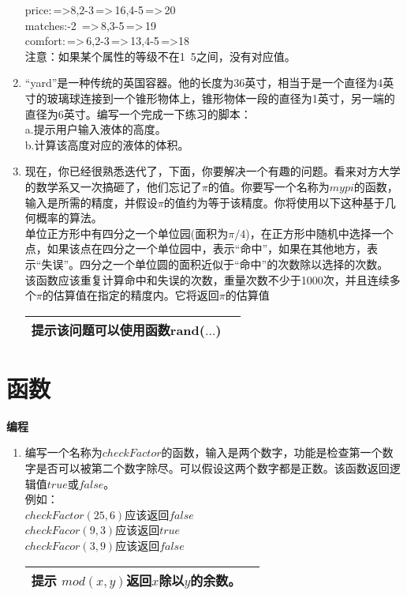 \documentclass[UTF8]{ctexart}
\begin{document}
\begin{enumerate}
	price:\,=>8,2-3\,=>\,16,4-5\,=>\,20\\
	matches:-2 \,=>\,8,3-5\,=>\,19\\
	comfort:\,=>\,6,2-3\,=>\,13,4-5\,=>18\\
	注意：如果某个属性的等级不在1~5之间，没有对应值。
	\item “yard”是一种传统的英国容器。他的长度为36英寸，相当于是一个直径为4英寸的玻璃球连接到一个锥形物体上，锥形物体一段的直径为1英寸，另一端的直径为6英寸。编写一个完成一下练习的脚本：\\
	a.提示用户输入液体的高度。\\
	b.计算该高度对应的液体的体积。
	\item 现在，你已经很熟悉迭代了，下面，你要解决一个有趣的问题。看来对方大学的数学系又一次搞砸了，他们忘记了$\pi$的值。你要写一个名称为$mypi$的函数，输入是所需的精度，并假设$\pi$的值约为等于该精度。你将使用以下这种基于几何概率的算法。\\
	单位正方形中有四分之一个单位园(面积为$\pi/4$)，在正方形中随机中选择一个点，如果该点在四分之一个单位园中，表示“命中”，如果在其他地方，表示“失误”。四分之一个单位圆的面积近似于“命中”的次数除以选择的次数。\\该函数应该重复计算命中和失误的次数，重量次数不少于1000次，并且连续多个$\pi$的估算值在指定的精度内。它将返回$\pi$的估算值\\
	\begin{table}[H]
		\centering
		\begin{tabular}{|p{10cm}|l|}
		\hline
		\textbf{提示}\qquad 该问题可以使用函数rand($\dots$)\\
		\hline
		\end{tabular}
	\end{table}
\end{enumerate}
\section{函数}
\textbf{编程}
\begin{enumerate}
	\item 编写一个名称为$checkFactor$的函数，输入是两个数字，功能是检查第一个数字是否可以被第二个数字除尽。可以假设这两个数字都是正数。该函数返回逻辑值$true$或$false$。\\例如：
	\\$checkFactor(25,6)$应该返回$false$\\$checkFacor(9,3)$应该返回$true$\\$checkFacor(3,9)$应该返回$false$\\
	\begin{table}[H]
		\centering
		\begin{tabular}{|p{10cm}|l|}
			\hline
			\textbf{提示} \qquad $mod(x,y)$返回$x$除以$y$的余数。\\
			\hline
		\end{tabular}
	\end{table}
\end{enumerate}
\end{document}
